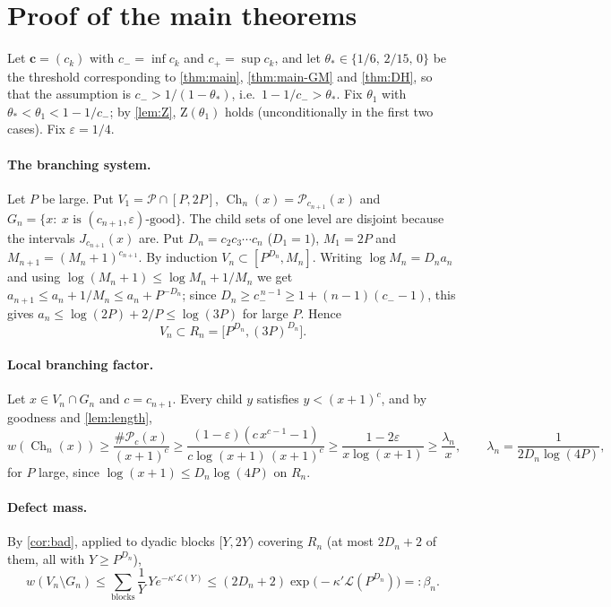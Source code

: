 \documentclass[11pt,a4paper]{article}
\theoremstyle{definition}
\newcommand{\PP}{\mathcal{P}}
\newcommand{\eps}{\varepsilon}
\newcommand{\Ch}{\operatorname{Ch}}
\begin{document}
\section{Proof of the main theorems}\label{sec:proof}

Let $\mathbf c=(c_k)$ with $c_-=\inf c_k$ and $c_+=\sup c_k$, and let $\theta_*\in\{1/6,\,2/15,\,0\}$ be the
threshold corresponding to \cref{thm:main}, \cref{thm:main-GM} and \cref{thm:DH}, so that the assumption is
$c_->1/(1-\theta_*)$, i.e.\ $1-1/c_->\theta_*$. Fix $\theta_1$ with $\theta_*<\theta_1<1-1/c_-$; by \cref{lem:Z},
$\mathrm Z(\theta_1)$ holds (unconditionally in the first two cases). Fix $\eps=1/4$.

\paragraph{The branching system.}
Let $P$ be large. Put $V_1=\PP\cap[P,2P]$, $\Ch_n(x)=\PP_{c_{n+1}}(x)$ and
$G_n=\{x:\ x\text{ is }(c_{n+1},\eps)\text{-good}\}$. The child sets of one level are disjoint because the
intervals $J_{c_{n+1}}(x)$ are. Put $D_n=c_2c_3\cdots c_n$ ($D_1=1$), $M_1=2P$ and $M_{n+1}=(M_n+1)^{c_{n+1}}$.
By induction $V_n\subset[P^{D_n},M_n]$. Writing $\log M_n=D_na_n$ and using $\log(M_n+1)\le\log M_n+1/M_n$ we get
$a_{n+1}\le a_n+1/M_n\le a_n+P^{-D_n}$; since $D_n\ge c_-^{\,n-1}\ge1+(n-1)(c_--1)$, this gives
$a_n\le\log(2P)+2/P\le\log(3P)$ for large $P$. Hence
\[
 V_n\subset R_n=\bigl[P^{D_n},(3P)^{D_n}\bigr].
\]

\paragraph{Local branching factor.}
Let $x\in V_n\cap G_n$ and $c=c_{n+1}$. Every child $y$ satisfies $y<(x+1)^c$, and by goodness and
\cref{lem:length},
\[
 w(\Ch_n(x))\ge\frac{\#\PP_c(x)}{(x+1)^c}\ge\frac{(1-\eps)(c\,x^{c-1}-1)}{c\log(x+1)\,(x+1)^c}
 \ge\frac{1-2\eps}{x\log(x+1)}\ge\frac{\lambda_n}{x},
 \qquad \lambda_n=\frac{1}{2D_n\log(4P)},
\]
for $P$ large, since $\log(x+1)\le D_n\log(4P)$ on $R_n$.

\paragraph{Defect mass.}
By \cref{cor:bad}, applied to dyadic blocks $[Y,2Y)$ covering $R_n$ (at most $2D_n+2$ of them, all with
$Y\ge P^{D_n}$),
\[
 w(V_n\setminus G_n)\le\sum_{\text{blocks}}\frac1Y\,Y e^{-\kappa'\mathcal L(Y)}
 \le(2D_n+2)\exp\bigl(-\kappa'\mathcal L(P^{D_n})\bigr)=:\beta_n .
\]
\end{document}
